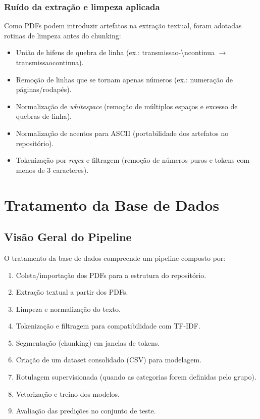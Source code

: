 \documentclass[12pt,a4paper]{article}
\begin{document}
\subsubsection{Ruído da extração e limpeza aplicada}

Como PDFs podem introduzir artefatos na extração textual, foram adotadas rotinas de limpeza antes do chunking:

\begin{itemize}[leftmargin=1.2cm]
    \item União de hifens de quebra de linha (ex.: transmissao-\textbackslash ncontinua $\rightarrow$ transmissaocontinua).
    \item Remoção de linhas que se tornam apenas números (ex.: numeração de páginas/rodapés).
    \item Normalização de \textit{whitespace} (remoção de múltiplos espaços e excesso de quebras de linha).
    \item Normalização de acentos para ASCII (portabilidade dos artefatos no repositório).
    \item Tokenização por \textit{regex} e filtragem (remoção de números puros e tokens com menos de 3 caracteres).
\end{itemize}

\clearpage
\section{Tratamento da Base de Dados}

\subsection{Visão Geral do Pipeline}

O tratamento da base de dados compreende um pipeline composto por:

\begin{enumerate}[leftmargin=1.2cm]
    \item Coleta/importação dos PDFs para a estrutura do repositório.
    \item Extração textual a partir dos PDFs.
    \item Limpeza e normalização do texto.
    \item Tokenização e filtragem para compatibilidade com TF-IDF.
    \item Segmentação (chunking) em janelas de tokens.
    \item Criação de um dataset consolidado (CSV) para modelagem.
    \item Rotulagem supervisionada (quando as categorias forem definidas pelo grupo).
    \item Vetorização e treino dos modelos.
    \item Avaliação das predições no conjunto de teste.
\end{enumerate}
\end{document}

